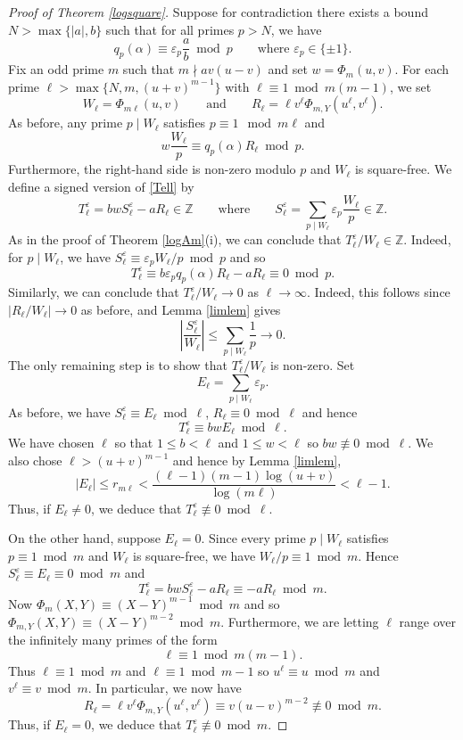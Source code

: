 \documentclass[10pt,a4paper]{amsart}
\begin{document}
\begin{proof}[Proof of Theorem \ref{logsquare}] 
Suppose for contradiction there exists a bound $N>\max\{|a|,b\}$ such that for all primes $p>N$, we have
\[q_p(\alpha)\equiv\varepsilon_p\frac{a}{b}\bmod p \qquad\text{where $\varepsilon_p\in\{\pm 1\}$}.\] 
Fix an odd prime $m$ such that $m\nmid av(u-v)$ and set $w=\Phi_m(u,v)$.
For each prime $\ell>\max\{N,m,(u+v)^{m-1}\}$ with $\ell\equiv 1\bmod m(m-1)$, we set 
\[W_\ell=\Phi_{m\ell}(u,v)\qquad\text{and}\qquad R_\ell=\ell v^\ell\Phi_{m,Y}(u^\ell,v^\ell).\]
As before, any prime $p\mid W_\ell$ satisfies $p\equiv 1\mod m\ell$ and
\[w\frac{W_\ell}{p}\equiv q_p(\alpha)R_\ell\bmod p.\]
Furthermore, the right-hand side is non-zero modulo $p$ and $W_\ell$ is square-free. 
We define a signed version of \eqref{Tell} by 
\begin{equation*}
T_\ell^\varepsilon=bwS_\ell^\varepsilon-aR_\ell\in\mathbb{Z}\qquad\text{where}\qquad S_\ell^\varepsilon=\sum_{p\mid W_\ell}\varepsilon_p\frac{W_\ell}{p}\in\mathbb{Z}.
\end{equation*}
As in the proof of Theorem \ref{logAm}(i), we can conclude that $T_\ell^\varepsilon/W_\ell\in\mathbb{Z}$. 
Indeed, for $p\mid W_\ell$, we have $S_\ell^\varepsilon\equiv \varepsilon_pW_\ell/p\bmod p$ and so 
\[T_\ell^\varepsilon\equiv b\varepsilon_pq_p(\alpha)R_\ell-aR_\ell\equiv 0\bmod p.\]
Similarly, we can conclude that $T_\ell^\varepsilon/W_\ell\to 0$ as $\ell\to\infty$. 
Indeed, this follows since $\left|R_\ell/W_\ell\right|\to 0$ as before, and Lemma \ref{limlem} gives
\[\left|\frac{S_\ell^\varepsilon}{W_\ell}\right|\leq \sum_{p\mid W_\ell}\frac{1}{p}\longrightarrow 0.\]
The only remaining step is to show that $T_\ell^\varepsilon/W_\ell$ is non-zero. 
Set 
\[E_\ell=\sum_{p\mid W_\ell}\varepsilon_p.\]
As before, we have $S_\ell^\varepsilon\equiv E_\ell\bmod \ell$, $R_\ell\equiv 0\bmod \ell$ and hence 
\[T_\ell^\varepsilon\equiv bwE_\ell\bmod \ell.\]
We have chosen $\ell$ so that $1\leq b<\ell$ and $1\leq w<\ell$ so $bw\not\equiv 0\bmod\ell$. 
We also chose $\ell>(u+v)^{m-1}$ and hence by Lemma \ref{limlem},
\[\left|E_\ell\right|\leq r_{m\ell}<\frac{(\ell-1)(m-1)\log(u+v)}{\log(m\ell)}<\ell-1.\]
Thus, if $E_\ell\neq 0$, we deduce that $T_\ell^\varepsilon\not\equiv 0\bmod \ell$.
\medskip

On the other hand, suppose $E_\ell=0$. 
Since every prime $p\mid W_\ell$ satisfies $p\equiv 1 \bmod m$ and $W_\ell$ is square-free, we have $W_\ell/p\equiv 1\bmod m$. Hence $S_\ell^\varepsilon\equiv E_\ell\equiv 0\bmod m$ and
\[T_\ell^\varepsilon=bwS_\ell^\varepsilon-aR_\ell\equiv -aR_\ell\bmod m.\]
Now $\Phi_m(X,Y)\equiv (X-Y)^{m-1}\bmod m$ and so $\Phi_{m,Y}(X,Y)\equiv (X-Y)^{m-2}\bmod m$. 
Furthermore, we are letting $\ell$ range over the infinitely many primes of the form
\[\ell\equiv 1\bmod m(m-1).\] 
Thus $\ell\equiv 1\bmod m$ and $\ell\equiv 1\bmod m-1$ so $u^\ell\equiv u\bmod m$ and $v^\ell\equiv v\bmod m$. 
In particular, we now have
\[R_\ell=\ell v^\ell\Phi_{m,Y}(u^\ell,v^\ell)\equiv v(u-v)^{m-2}\not\equiv 0\bmod m.\]
Thus, if $E_\ell=0$, we deduce that $T_\ell^\varepsilon\not\equiv 0\bmod m$.
\medskip


\end{proof}
\end{document}
